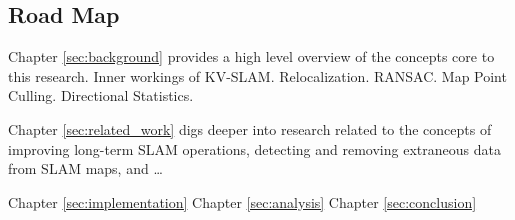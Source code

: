 \subsection{Road Map}

Chapter \ref{sec:background} provides a high level overview of the concepts core to this research. Inner workings of KV-SLAM. Relocalization. RANSAC. Map Point Culling. Directional Statistics.

Chapter \ref{sec:related_work} digs deeper into research related to the concepts of improving long-term SLAM operations, detecting and removing extraneous data from SLAM maps, and \dots

Chapter \ref{sec:implementation}
Chapter \ref{sec:analysis}
Chapter \ref{sec:conclusion}
